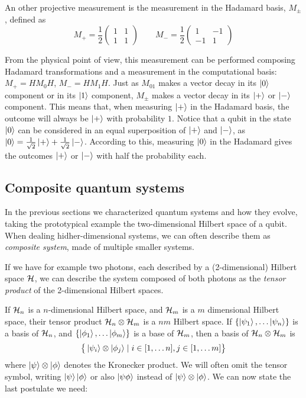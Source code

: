 An other projective measurement is the measurement in the Hadamard basis, $M_\pm$, defined as \[ M_+ = \frac{1}{2}\begin{pmatrix} 1 & 1 \\ 1 & 1\end{pmatrix} \qquad
M_- = \frac{1}{2}\begin{pmatrix}1 & -1 \\ -1 & 1\end{pmatrix} \]

From the physical point of view, this measurement can be performed composing Hadamard transformations and a measurement in the computational basis: $M_+ = HM_0H$, $M_- = H M_1 H$. Just as $M_{01}$ makes a vector decay in its $\ket{0}$ component or in its $\ket{1}$ component, $M_\pm$ makes a vector decay in its $\ket{+}$ or $\ket{-}$ component. This means that, when measuring $\ket{+}$ in the Hadamard basis, the outcome will always be $\ket{+}$ with probability $1$. Notice that a qubit in the state $\ket{0}$ can be considered in an equal superposition of $\ket{+}$ and $\ket{-}$, as $\ket{0} = \frac{1}{\sqrt{2}}\ket{+} + \frac{1}{\sqrt{2}}\ket{-}$. According to this, measuring $\ket{0}$ in the Hadamard gives the outcomes $\ket{+}$ or $\ket{-}$ with half the probability each.


\subsection{Composite quantum systems}
In the previous sections we characterized quantum systems and how they evolve, taking the prototypical example the two-dimensional Hilbert space of a qubit. When dealing hidher-dimensional systems, we can often describe them as \textit{composite system}, made of multiple smaller systems.

If we have for example two photons,  each described by a (2-dimensional) Hilbert space $\mathcal{H}$, we can describe the system composed of both photons as the \textit{tensor product} of the 2-dimensional Hilbert spaces.	

If $\mathcal{H}_n$ is a $n$-dimensional Hilbert space, and $\mathcal{H}_m$ is a $m$ dimensional Hilbert space, their tensor product $\mathcal{H}_n \otimes \mathcal{H}_m$ is a $nm$ Hilbert space. If $\{\ket{\psi_1}, \ldots \ket{\psi_n}\}$ is a basis of $\mathcal{H}_n$, and $\{\ket{\phi_1}, \ldots\ket{\phi_m}\}$ is a base of $\mathcal{H}_m$, then a basis of $\mathcal{H}_n \otimes \mathcal{H}_m$ is\[\big\{\ket{\psi_i}\otimes\ket{\phi_j} \mid i \in [1, \ldots n], j \in [1, \ldots m] \big\}\]
 where $\ket{\psi} \otimes \ket{\phi}$ denotes the Kronecker product. We will often omit the tensor symbol, writing $\ket{\psi}\ket{\phi}$ or also $\ket{\psi\phi}$ instead of $\ket{\psi}\otimes\ket{\phi}$. We can now state the last postulate we need:

